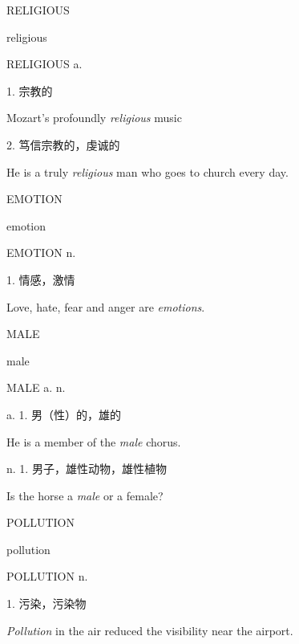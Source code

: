 \begin{flashcard}{
RELIGIOUS

religious
}
\begin{center}
RELIGIOUS a. 
\end{center}
1. 宗教的

Mozart's profoundly \textit{religious} music

2. 笃信宗教的，虔诚的

He is a truly \textit{religious} man who goes to church every day.

\end{flashcard}
\begin{flashcard}{
EMOTION

emotion
}
\begin{center}
EMOTION n. 
\end{center}
1. 情感，激情

Love, hate, fear and anger are \textit{emotions}.

\end{flashcard}
\begin{flashcard}{
MALE

male
}
\begin{center}
MALE a. n. \textipa{[meil]}
\end{center}
a. 1. 男（性）的，雄的

He is a member of the \textit{male} chorus.

n. 1. 男子，雄性动物，雄性植物

Is the horse a \textit{male} or a female?

\end{flashcard}
\begin{flashcard}{
POLLUTION

pollution
}
\begin{center}
POLLUTION n. 
\end{center}
1. 污染，污染物

\textit{Pollution} in the air reduced the visibility near the airport.

\end{flashcard}
